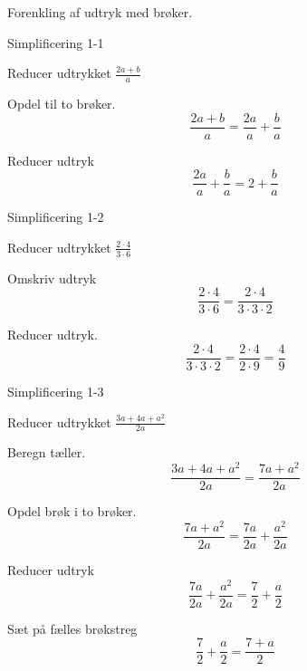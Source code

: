 \documentclass{article}
\begin{document}
Forenkling af udtryk med brøker.

\tableofcontents
\newpage

\begin{exercise}{Simplificering 1-1}

Reducer udtrykket $\frac{2a+b}{a}$


\hint

Opdel  til to brøker.
\[
\frac{2a+b}{a} = \frac{2a}{a} + \frac{b}{a}
\]

\hint

Reducer udtryk 
\[
\frac{2a}{a} + \frac{b}{a}  = 2 + \frac{b}{a}
\]

\end{exercise}

\newpage

\begin{exercise}{Simplificering 1-2}
	
	Reducer udtrykket $\frac{2 \cdot 4}{3 \cdot 6}$
	
	
	\hint
	
	Omskriv udtryk
	\[
	\frac{2 \cdot 4}{3 \cdot 6}  = \frac{2 \cdot 4}{3 \cdot 3 \cdot 2} 
	\]
	
	\hint
	
	Reducer udtryk.
	\[
	\frac{2 \cdot 4}{3 \cdot 3 \cdot 2}  = \frac{2 \cdot 4}{2 \cdot 9} = \frac{4}{9}
	\]
	
\end{exercise}

\newpage

\begin{exercise}{Simplificering 1-3}
	
	Reducer udtrykket $\frac{3a+4a+a^2}{2a}$
	
	
	\hint
	
	Beregn tæller.
	\[
	\frac{3a+4a+a^2}{2a} = \frac{7a+a^2}{2a}
	\]
	
	\hint
	
	Opdel brøk i to brøker.
	\[
	\frac{7a+a^2}{2a}  = \frac{7a}{2a} + \frac{a^2}{2a} 
	\]
	
	\hint
	
	Reducer udtryk
	\[
	\frac{7a}{2a} + \frac{a^2}{2a}  = \frac{7}{2} + \frac{a}{2}
	\]	 
	
	\hint
	
	Sæt på fælles brøkstreg
	\[
	\frac{7}{2} + \frac{a}{2} = \frac{7+a}{2} 
	\]
	
\end{exercise}
\end{document}
